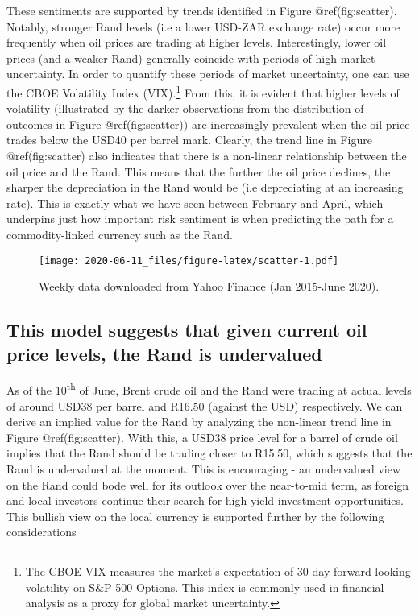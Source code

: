 \documentclass[
]{article}
\begin{document}
These sentiments are supported by trends identified in Figure
@ref(fig:scatter). Notably, stronger Rand levels (i.e a lower USD-ZAR
exchange rate) occur more frequently when oil prices are trading at
higher levels. Interestingly, lower oil prices (and a weaker Rand)
generally coincide with periods of high market uncertainty. In order to
quantify these periods of market uncertainty, one can use the CBOE
Volatility Index (VIX).\footnote{The CBOE VIX measures the market's
  expectation of 30-day forward-looking volatility on S\&P 500 Options.
  This index is commonly used in financial analysis as a proxy for
  global market uncertainty.} From this, it is evident that higher
levels of volatility (illustrated by the darker observations from the
distribution of outcomes in Figure @ref(fig:scatter)) are increasingly
prevalent when the oil price trades below the USD40 per barrel mark.
Clearly, the trend line in Figure @ref(fig:scatter) also indicates that
there is a non-linear relationship between the oil price and the Rand.
This means that the further the oil price declines, the sharper the
depreciation in the Rand would be (i.e depreciating at an increasing
rate). This is exactly what we have seen between February and April,
which underpins just how important risk sentiment is when predicting the
path for a commodity-linked currency such as the Rand.

\begin{figure}
\centering
\texttt{[image: 2020-06-11\_files/figure-latex/scatter-1.pdf]}
\caption{Weekly data downloaded from Yahoo Finance (Jan 2015-June
2020).}
\end{figure}

\hypertarget{this-model-suggests-that-given-current-oil-price-levels-the-rand-is-undervalued}{%
\subsection{This model suggests that given current oil price levels, the
Rand is
undervalued}\label{this-model-suggests-that-given-current-oil-price-levels-the-rand-is-undervalued}}

As of the 10\textsuperscript{th} of June, Brent crude oil and the Rand
were trading at actual levels of around USD38 per barrel and R16.50
(against the USD) respectively. We can derive an implied value for the
Rand by analyzing the non-linear trend line in Figure @ref(fig:scatter).
With this, a USD38 price level for a barrel of crude oil implies that
the Rand should be trading closer to R15.50, which suggests that the
Rand is undervalued at the moment. This is encouraging - an undervalued
view on the Rand could bode well for its outlook over the near-to-mid
term, as foreign and local investors continue their search for
high-yield investment opportunities. This bullish view on the local
currency is supported further by the following considerations
\end{document}
